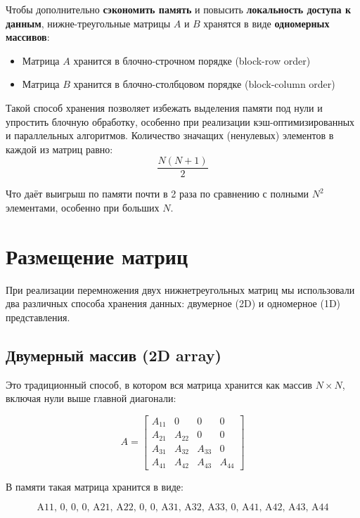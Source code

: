 \documentclass[14pt, russian]{matmex-diploma-custom}
\begin{document}
Чтобы дополнительно \textbf{сэкономить память} и повысить \textbf{локальность доступа к данным}, нижне-треугольные матрицы $A$ и $B$ хранятся в виде \textbf{одномерных массивов}:

\begin{itemize}
  \item Матрица $A$ хранится в блочно-строчном порядке (block-row order)
  \item Матрица $B$ хранится в блочно-столбцовом порядке (block-column order)
\end{itemize}

Такой способ хранения позволяет избежать выделения памяти под нули и упростить блочную обработку, особенно при реализации кэш-оптимизированных и параллельных алгоритмов. Количество значащих (ненулевых) элементов в каждой из матриц равно:
\begin{equation}
\frac{N(N+1)}{2}
\end{equation}

Что даёт выигрыш по памяти почти в 2 раза по сравнению с полными $N^2$ элементами, особенно при больших $N$.






\section{Размещение матриц}
При реализации перемножения двух нижнетреугольных матриц мы использовали два различных способа хранения данных: двумерное (2D) и одномерное (1D) представления.
\subsection{Двумерный массив (2D array)}

Это традиционный способ, в котором вся матрица хранится как массив $N \times N$, включая нули выше главной диагонали:

\[
A =
\begin{bmatrix}
A_{11} & 0     & 0     & 0 \\
A_{21} & A_{22} & 0     & 0 \\
A_{31} & A_{32} & A_{33} & 0 \\
A_{41} & A_{42} & A_{43} & A_{44}
\end{bmatrix}
\]

В памяти такая матрица хранится в виде:

\[
\text{A11, 0, 0, 0, A21, A22, 0, 0, A31, A32, A33, 0, A41, A42, A43, A44}
\]
\end{document}
